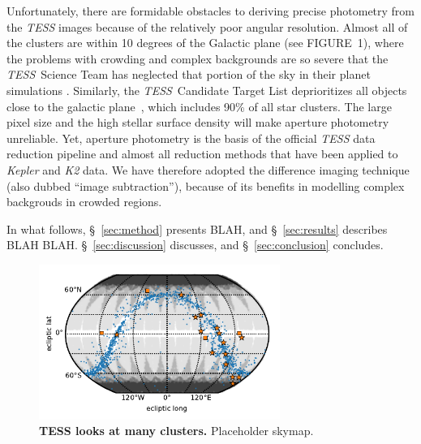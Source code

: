 \documentclass[12pt,twocolumn,tighten]{aastex62}
\begin{document}
Unfortunately, there are formidable obstacles to deriving precise
photometry from the {\it TESS} images because of the relatively poor
angular resolution.  Almost all of the clusters are within 10 degrees
of the Galactic plane (see FIGURE~1), where the problems with crowding
and complex backgrounds are so severe that the {\it TESS}\, Science
Team has neglected that portion of the sky in their planet simulations
\citep{Sullivan_et_al_2015}. Similarly, the {\it TESS}\, Candidate
Target List deprioritizes all objects close to the galactic
plane~\citep{stassun_TIC_2018,stassun_TIC8_2019}, which includes 90\%
of all star clusters.  The large pixel size and the high stellar
surface density will make aperture photometry unreliable.  Yet,
aperture photometry is the basis of the official {\it TESS} data
reduction pipeline and almost all reduction methods that have been
applied to {\it Kepler} and {\it K2} data.
We have therefore adopted the difference imaging technique (also
dubbed ``image subtraction''), because of its benefits in modelling
complex backgrouds in crowded regions.

In what follows, \S~\ref{sec:method} presents BLAH, and
\S~\ref{sec:results} describes BLAH BLAH.
\S~\ref{sec:discussion} discusses, and \S~\ref{sec:conclusion}
concludes.


\begin{figure}[t]
	\begin{center}
		\leavevmode
		\includegraphics[width=0.7\textwidth]{cluster_positions.pdf}
	\end{center}
	\vspace{-0.5cm}
	\caption{
    {\bf TESS looks at many clusters.} Placeholder skymap.
		\label{fig:clustermap}
	}
\end{figure}
\end{document}
